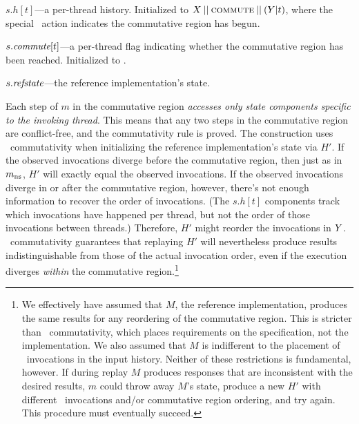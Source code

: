 \begin{CompactItemize}
\item $s.h[t]$---a per-thread history. Initialized to
  $X\mathbin{||}\textsc{commute}\mathbin{||}(Y|t)$, where the special
  \COMMUTE\ action indicates the commutative region has begun.
\item $s.\textit{commute}[t]$---a per-thread flag indicating whether the
  commutative region has been reached. Initialized to \FALSE.
\item $s.\textit{refstate}$---the reference implementation's state.
\end{CompactItemize}

\noindent%
Each step of $m$ in the commutative region \emph{accesses
only state components specific to the invoking thread}.
%
This means that any two steps in the commutative region are
conflict-free, and the commutativity rule is proved.
%
The construction uses \SRI\ commutativity when initializing the
reference implementation's state via $H'$.
%
If the observed invocations diverge before the commutative region, then
just as in $m_{\text{ns}}$, $H'$ will exactly equal the observed invocations.
%
If the observed invocations diverge in or after the commutative region,
however, there's not enough information to recover the order of
invocations. (The $s.h[t]$ components track which invocations have
happened per thread, but not the order of those invocations between
threads.) Therefore, $H'$ might reorder the invocations in $Y$.
%
\SRI\ commutativity guarantees that replaying $H'$ will nevertheless produce
results indistinguishable from those of the actual invocation order,
even if the execution
diverges \emph{within} the commutative region.\footnote{%
  We effectively have assumed that $M$, the reference
  implementation, produces the same results for any reordering of the
  commutative region. This is stricter than \SRI\ commutativity, which
  places requirements on the {specification}, not the
  implementation. We also assumed that $M$ is indifferent to the
  placement of \POLL\ invocations in
  the input history.  Neither of these restrictions is fundamental, however.  If
  during replay $M$ produces responses that are inconsistent with the
  desired results, $m$ could throw away $M$'s state, produce a new $H'$
  with different \POLL\ invocations and/or commutative region ordering,
  and try again.
  This procedure must eventually succeed.}

